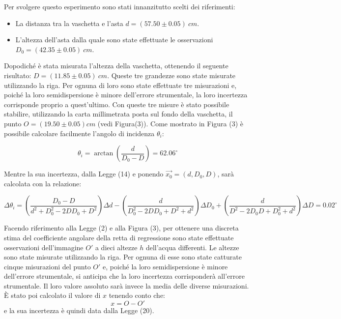 Per svolgere questo esperimento sono stati innanzitutto scelti dei riferimenti:
\begin{itemize}
	\item La distanza tra la vaschetta e l'asta $d=(57.50\pm0.05)\ cm$.
	\item L'altezza dell'asta dalla quale sono state effettuate le osservazioni $D_0=(42.35\pm0.05)\ cm$.
\end{itemize}
Dopodiché è stata misurata l'altezza della vaschetta, ottenendo il seguente risultato: $D=(11.85\pm0.05)\ cm$. Queste tre grandezze sono state misurate utilizzando la riga. Per ognuna di loro sono state effettuate tre misurazioni e, poiché la loro semidispersione è minore dell'errore strumentale, la loro incertezza corrisponde proprio a quest'ultimo. Con queste tre misure è stato possibile stabilire, utilizzando la carta millimetrata posta sul fondo della vaschetta, il punto $O=(19.50\pm0.05) cm$ (vedi Figura(3)). Come mostrato in Figura (3) è possibile calcolare facilmente l'angolo di incidenza $\theta_i$:

\begin{equation}
	\theta_i=\arctan(\frac{d}{D_0-D})=62.06^{\circ}
\end{equation}

Mentre la sua incertezza, dalla Legge (14) e ponendo $\vec{x_0}=(d,D_0,D)$, sarà calcolata con la relazione:

\begin{equation}
	\Delta\theta_i=\left(\frac{D_0-D}{d^2+D_0^2-2DD_0+D^2}\right)\Delta d-\left(\frac{d}{D_0^2-2DD_0+D^2+d^2}\right)\Delta D_0+\left(\frac{d}{D^2-2D_0D+D_0^2+d^2}\right)\Delta D=0.02^{\circ}
\end{equation}

Facendo riferimento alla Legge (2) e alla Figura (3), per ottenere una discreta stima del coefficiente angolare della retta di regressione sono state effettuate osservazioni dell'immagine $O'$ a dieci altezze $h$ dell'acqua differenti. Le altezze sono state misurate utilizzando la riga. Per ognuna di esse sono state catturate cinque misurazioni del punto $O'$ e, poiché la loro semidispersione è minore dell'errore strumentale, si anticipa che la loro incertezza corrisponderà all'errore strumentale. Il loro valore assoluto sarà invece la media delle diverse misurazioni. È stato poi calcolato il valore di $x$ tenendo conto che:
\begin{equation}
	x=O-O'
\end{equation}
e la sua incertezza è quindi data dalla Legge (20).

